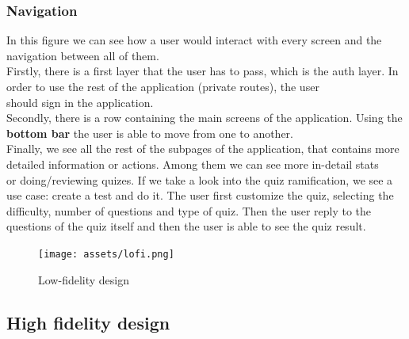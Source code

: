 \subsubsection{Navigation}
In this figure we can see how a user would interact with every screen and the navigation between all of them. \\

Firstly, there is a first layer that the user has to pass, which is the auth layer. In order to use the rest of the application (private routes), the user \\
should sign in the application. \\

Secondly, there is a row containing the main screens of the application. Using the \textbf{bottom bar} the user is able to move from one to another. \\

Finally, we see all the rest of the subpages of the application, that contains more detailed information or actions. Among them we can see more in-detail stats \\
or doing/reviewing quizes.
If we take a look into the quiz ramification, we see a use case: create a test and do it. The user first customize the quiz, selecting the difficulty, number of questions and type of quiz. Then the user reply to the questions of the quiz itself and then the user is able to see the quiz result.\\

\begin{figure}[H]
    \centering
        \texttt{[image: assets/lofi.png]}
    \caption{Low-fidelity design}
    \label{fig:design_lofi}
\end{figure}

\subsection{High fidelity design}

